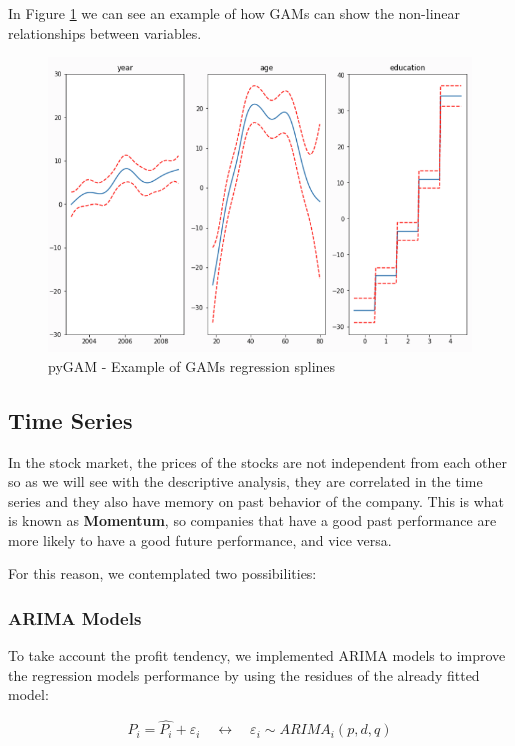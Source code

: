 \documentclass[11pt,english,a4paper,hidelinks]{book}
\begin{document}
\noindent In Figure \ref{fig:splines_example} we can see an example of how GAMs can show the non-linear relationships between variables.
\begin{figure}[H]
    \centering
    \includegraphics[width=1\textwidth]{images/code/descriptive analysis/gam/splines_example.png}
    \caption{pyGAM - Example of GAMs regression splines}
    \label{fig:splines_example}
\end{figure}

\subsection{Time Series}
In the stock market, the prices of the stocks are not independent from each other so as we will see with the descriptive analysis, they are correlated in the time series and they also have memory on past behavior of the company. This is what is known as \textbf{Momentum}, so companies that have a good past performance are more likely to have a good future performance, and vice versa.

\vspace{0.5cm}
\noindent For this reason, we contemplated two possibilities:

\subsubsection{ARIMA Models}
To take account the profit tendency, we implemented ARIMA models to improve the regression models performance by using the residues of the already fitted model:

\begin{equation}
    P_i = \hat{P_i} + {\varepsilon_i} \quad \longleftrightarrow \quad {\varepsilon_i} \sim ARIMA_i(p,d,q)
\end{equation}
\end{document}
